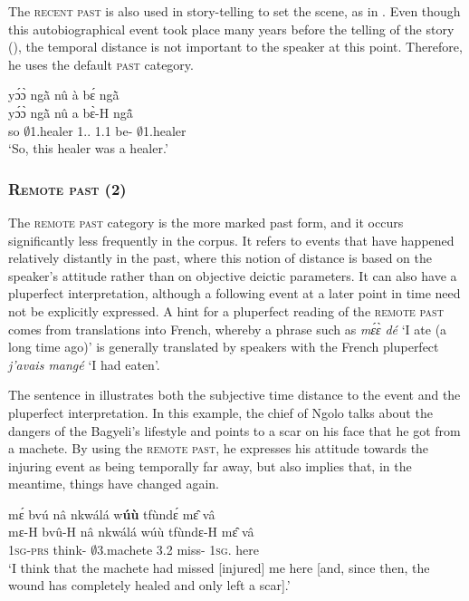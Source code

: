 The \textsc{recent past} is also used in story-telling to set the scene, as in . Even though this autobiographical event took place many years before the telling of the story (), the temporal distance is not important to the speaker at this point. Therefore, he uses the default \textsc{past} category.

\ea\label{pst1gen}
  \glll   yɔ́ɔ̀ ngã̀ nû à bɛ́ ngã̀   \\
          yɔ́ɔ̀ ngã̀ nû a bɛ̀-H ngã̂ \\
         so $\emptyset$1.healer 1.{\DEM}.{\PROX} 1.{\PST}1 be-{\R} $\emptyset$1.healer\\
    \trans `So, this healer was a healer.'
\z



\subsubsection{\textsc{Remote past ({\PST}2)}}
\label{sec:pst2}

The \textsc{remote past} category is the more marked past form, and it occurs significantly less frequently in the corpus. It refers to events that have happened relatively distantly in the past, where this notion of distance is based on the speaker's attitude rather than on objective deictic parameters. It can also have a pluperfect interpretation, although a following event at a later point in time need not be explicitly expressed.  A hint for a pluperfect reading of the \textsc{remote past} comes from translations into French, whereby a phrase such as {\itshape mɛ́ɛ̀ dé} `I ate (a long time ago)' is generally translated by speakers with the French pluperfect {\itshape j'avais mangé} `I had eaten'. 

The sentence in  illustrates both the subjective time distance to the event and the pluperfect interpretation. In this example, the chief of Ngolo talks about the dangers of the Bagyeli's lifestyle and points to a scar on his face that he got from a machete. By using the \textsc{remote past}, he expresses his attitude towards the injuring event as being temporally far away, but also implies that, in the meantime, things have changed again.

\ea\label{PST2a}
  \glll    mɛ́ bvú nâ nkwálá w{\bfseries úù} tfùndɛ́ mɛ̂ vâ \\
           mɛ-H bvû-H nâ nkwálá wúù tfùndɛ-H mɛ̂ vâ \\
              1\textsc{sg}-\textsc{prs} think-{\R} {\COMP} $\emptyset$3.machete 3.{\PST}2 miss-{\R} 1\textsc{sg}.{\OBJ} here\\
    \trans `I think that the machete had missed [injured] me here [and, since then, the wound has completely healed and only left a scar].'
\z

